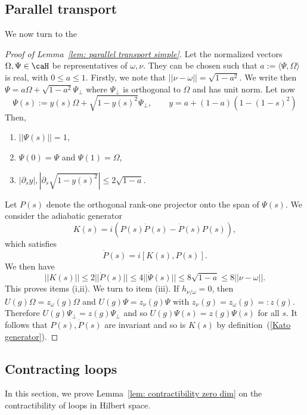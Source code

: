 %
\subsection{Parallel transport}
We now turn to the
%
\begin{proof}[Proof of Lemma~\ref{lem: parallel transport simple}]
	Let the normalized vectors $\Omega,\Psi \in \caH$ be representatives of  $\omega,\nu$. They can be chosen such that $a:= \langle\Psi,\Omega\rangle$ is real, with $0\leq a\leq 1$. Firstly, we note that $ ||\nu-\omega ||= \sqrt{1-a^2}$. 
	We write then $\Psi=a \Omega+\sqrt{1-a^2}\Psi_\perp$ where $\Psi_\perp$ is orthogonal to $\Omega$ and has unit norm. 
	Let now
	$$
	\Psi(s):=y(s)\Omega + \sqrt{1-y(s)^2}\Psi_\perp, \qquad y=a+(1-a)(1-(1-s)^2) 
	$$
	Then, 
	\begin{enumerate}
		\item $||\Psi(s)||=1$,
		\item $\Psi(0)=\Psi$ and  $\Psi(1)=\Omega$,
		\item $ |\partial_s y|,  |\partial_s \sqrt{1-y(s)^2}| \leq 2\sqrt{1-a} $. 
	\end{enumerate}
	Let $P(s)$ denote the orthogonal rank-one projector onto the span of $\Psi(s)$.
	We consider the adiabatic generator 
	\begin{equation}\label{Kato generator}
		K(s)=i (P(s)\dot{P}(s)-\dot{P}(s)P(s)),
	\end{equation}
	which satisfies
	\begin{equation*}
		\dot P(s) = i[K(s),P(s)].
	\end{equation*}
	We then have
	$$
	|| K(s)|| \leq 2 || \dot{P}(s)|| \leq  4 ||\dot{\Psi}(s)|| \leq 8 \sqrt{1-a} \leq 8 || \nu-\omega ||.
	$$
	This proves items (i,ii). We turn to item (iii). If $h_{\nu/\omega} = 0$, then $U(g) \Omega = z_\omega(g)\Omega$ and $U(g) \Psi = z_\nu(g)\Psi$ with $z_\nu(g)= z_\omega(g)=:z(g)$. Therefore $U(g) \Psi_\perp = z(g)\Psi_\perp$ and so $U(g)\Psi(s) = z(g)\Psi(s)$ for all $s$. It follows that $P(s),\dot P(s)$ are invariant and so is $K(s)$ by definition~(\ref{Kato generator}).
\end{proof}




\subsection{Contracting loops}

In this section, we prove Lemma~\ref{lem: contractibility zero dim} on the contractibility of loops in Hilbert space.

